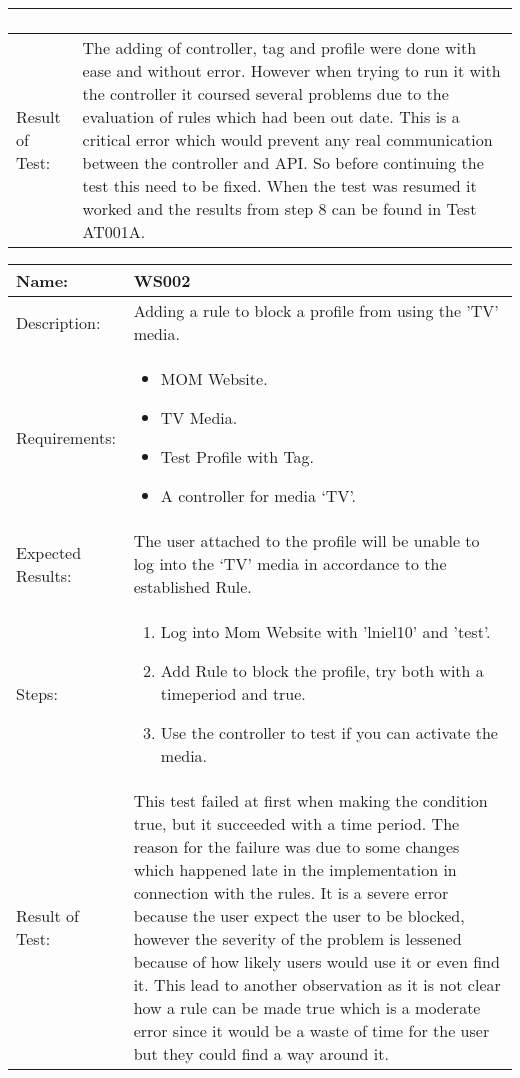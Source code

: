 \begin{table}[h]
\begin{tabular*}{\textwidth}{|l|l|}
{\begin{enumerate}
		\end{enumerate}}
		\\		
		\hline
		Result of Test: & \parbox{.70\textwidth}{The adding of controller, tag and profile were done with ease and without error. However when trying to run it with the controller it coursed several problems due to the evaluation of rules which had been out date. This is a critical error which would prevent any real communication between the controller and API. So before continuing the test this need to be fixed. When the test was resumed it worked and the results from step 8 can be found in Test AT001A.} \\
		\hline
		\end{tabular*}
\end{table}



\begin{table}[h]
	\centering
		\begin{tabular*}{\textwidth}{|l|l|}
		\hline
		\hline
		Name: & WS002\\
		\hline
		Description: & \parbox{0.70\textwidth}{Adding a rule to block a profile from using the 'TV' media.}\\
		\hline
		Requirements: & \parbox{0.70\textwidth}{
		\begin{itemize}
			\item MOM Website.
			\item TV Media.
			\item Test Profile with Tag.
			\item A controller for media `TV'.
		\end{itemize}}
		\\
		\hline
		Expected Results: & \parbox{.70\textwidth}{The user attached to the profile will be unable to log into the `TV' media in accordance to the established Rule.}\\
		\hline
		Steps: & \parbox{.70\textwidth}{
		\begin{enumerate}
			\item Log into Mom Website with 'lniel10' and 'test'.
			\item Add Rule to block the profile, try both with a timeperiod and true.
			\item Use the controller to test if you can activate the media.
		\end{enumerate}}
		\\		
		\hline
		Result of Test: &  \parbox{.70\textwidth}{This test failed at first when making the condition true, but it succeeded with a time period. The reason for the failure was due to some changes which happened late in the implementation in connection with the rules. It is a severe error because the user expect the user to be blocked, however the severity of the problem is lessened because of how likely users would use it or even find it. This lead to another observation as it is not clear how a rule can be made true which is a moderate error since it would be a waste of time for the user but they could find a way around it.}\\
		\hline
		\end{tabular*}
\end{table}


